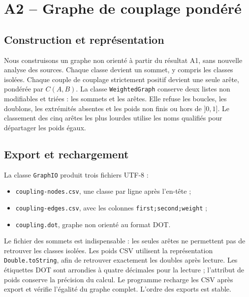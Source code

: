 \documentclass[11pt,a4paper]{article}
\begin{document}
\section{A2 -- Graphe de couplage pondéré}
\subsection{Construction et représentation}
Nous construisons un graphe non orienté à partir du résultat A1, sans nouvelle
analyse des sources. Chaque classe devient un sommet, y compris les classes
isolées. Chaque couple de couplage strictement positif devient une seule arête,
pondérée par $C(A,B)$. La classe \texttt{WeightedGraph} conserve deux listes
non modifiables et triées : les sommets et les arêtes. Elle refuse les boucles,
les doublons, les extrémités absentes et les poids non finis ou hors de $]0,1]$.
Le classement des cinq arêtes les plus lourdes utilise les noms qualifiés
pour départager les poids égaux.

\subsection{Export et rechargement}
La classe \texttt{GraphIO} produit trois fichiers UTF-8 :
\begin{itemize}
\item \texttt{coupling-nodes.csv}, une classe par ligne après l'en-tête ;
\item \texttt{coupling-edges.csv}, avec les colonnes
\texttt{first;second;weight} ;
\item \texttt{coupling.dot}, graphe non orienté au format DOT.
\end{itemize}
Le fichier des sommets est indispensable : les seules arêtes ne permettent
pas de retrouver les classes isolées. Les poids CSV utilisent la représentation
\texttt{Double.toString}, afin de retrouver exactement les doubles après lecture.
Les étiquettes DOT sont arrondies à quatre décimales pour la lecture ; l'attribut
de poids conserve la précision du calcul. Le programme recharge les CSV après
export et vérifie l'égalité du graphe complet. L'ordre des exports est stable.
\end{document}
